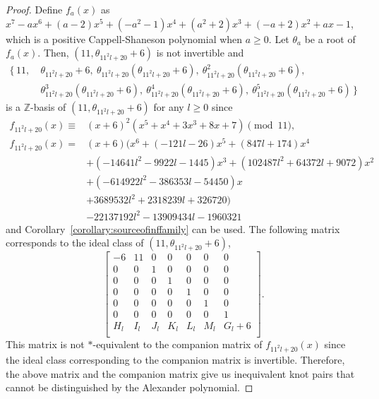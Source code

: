 \documentclass[10pt,a4paper]{amsart}
\begin{document}
\begin{proof}
    Define $f_a(x)$ as $x^7-ax^6+(a-2)x^5+(-a^2-1)x^4+(a^2+2)x^3+(-a+2)x^2+ax-1$, which is a positive Cappell-Shaneson polynomial when $a \ge 0$. Let $\theta_a$ be a root of $f_a(x)$. Then, $(11, \theta_{11^2l+20} + 6)$ is not invertible and 
    \[
    \begin{aligned}
    \{\,11,\ &\theta_{11^2l+20} + 6, \ \theta_{11^2l+20} ( \theta_{11^2l+20} + 6), \ \theta_{11^2l+20}^2 (\theta_{11^2l+20} + 6), \\ &\theta_{11^2l+20}^3 (\theta_{11^2l+20} + 6), \ \theta_{11^2l+20}^4 (\theta_{11^2l+20} + 6), \ \theta_{11^2l+20}^5 (\theta_{11^2l+20} + 6)\, \}
    \end{aligned}
    \]
    is a $\mathbb{Z}$-basis of $(11, \theta_{11^2l+20} + 6)$ for any $l \ge 0$ since
    \begin{align*}
        f_{11^2l+20}(x)\equiv &(x+6)^2(x^5+x^4+3x^3+8x+7) \pmod {11} ,\\
        f_{11^2l+20}(x) = &(x+6)(x^6+(-121l-26)x^5+(847l+174)x^4\\
                        &+(-14641l^2-9922l-1445)x^3+(102487l^2+64372l+9072)x^2\\
                        &+(-614922l^2-386353l-54450)x\\
                        &+3689532l^2+2318239l+326720)\\
                        &-22137192l^2-13909434l-1960321
    \end{align*}
    and Corollary~\ref{corollary:sourceofinffamily} can be used. The following matrix corresponds to the ideal class of $(11, \theta_{11^2l+20} + 6)$,
    \[
        \begin{bmatrix}
    	-6 & 11 & 0 & 0 & 0 & 0 & 0\\
            0 & 0 & 1 & 0 & 0 & 0 & 0\\
            0 & 0 & 0 & 1 & 0 & 0 & 0\\
            0 & 0 & 0 & 0 & 1 & 0 & 0\\
            0 & 0 & 0 & 0 & 0 & 1 & 0\\
            0 & 0 & 0 & 0 & 0 & 0 & 1\\
            H_l & I_l & J_l & K_l & L_l & M_l & G_l+6\\
    		\end{bmatrix}.
    \]
    This matrix is not $*$-equivalent to the companion matrix of $f_{11^2l+20}(x)$ since the ideal class corresponding to the companion matrix is invertible. Therefore, the above matrix and the companion matrix give us inequivalent knot pairs that cannot be distinguished by the Alexander polynomial.
\end{proof}
\end{document}

